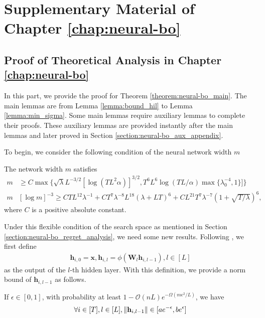 \chapter{Supplementary Material of Chapter \ref{chap:neural-bo}} 
\label{section:neural-bo_supp}

\section{Proof of Theoretical Analysis in Chapter \ref{chap:neural-bo}}
\label{section:neural-bo_appendix}
In this part, we provide the proof for Theorem \ref{theorem:neural-bo_main}. The main lemmas are from Lemma \ref{lemma:bound_hil} to Lemma \ref{lemma:min_sigma}. Some main lemmas require auxiliary lemmas to complete their proofs. These auxiliary lemmas are provided instantly after the main lemmas and later proved in Section \ref{section:neural-bo_aux_appendix}. 


To begin, we consider the following condition of the neural network width $m$
\begin{condition}
\label{cond:set}
The network width $m$ satisfies
  \begin{align*}
     m & \geq C \max \Big\{ \sqrt{\lambda} L^{-3/2} [\log (TL^2 \alpha)]^{3/2}, T^6 L^6 \log (TL/ \alpha) \max \{\lambda_0^{-4},1 \} ] \Big\} 
     \\
     m  & [\log m ]^{-3} \geq CTL^{12} \lambda^{-1} + CT^7 \lambda^{-8}L^{18}(\lambda + LT)^6 + CL^{21}T^7\lambda^{-7}(1 + \sqrt{T/ \lambda})^6,
    \end{align*} 
    where $C$ is a positive absolute constant.
\end{condition}
Under this flexible condition of the search space as mentioned in Section \ref{section:neural-bo_regret_analysis}, we need some new results. Following \citet{allen2019convergence}, we first define 
\begin{align*}
    \mathbf{h}_{i,0} = \mathbf{x}, \mathbf{h}_{i,l} = \phi(\mathbf{W}_l \mathbf{h}_{i, l-1}), l \in [L]
\end{align*}
as the output of the $l$-th hidden layer. With this definition, we provide a norm bound of $\mathbf{h}_{i, l-1}$ as follows.

\begin{lemma}
\label{lemma:bound_hil}
If $\epsilon \in [0,1]$,  with probability at least $1-\mathcal{O}(nL)e^{-\Omega(m\epsilon^2/L)}$, we have
\[ \forall i \in [T], l \in [L], \norm{\mathbf{h}_{i, l-1}} \in [ae^{-\epsilon}, be^\epsilon] 
\]
\end{lemma}

